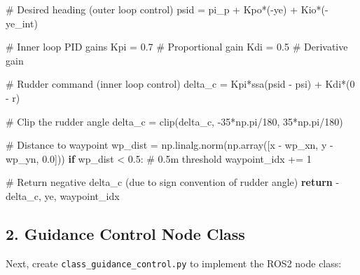 \documentclass[
  letterpaper,
  DIV=11,
  numbers=noendperiod]{scrreprt}
\newenvironment{Shaded}{\begin{snugshade}}{\end{snugshade}}
\newcommand{\CommentTok}[1]{\textcolor[rgb]{0.37,0.37,0.37}{#1}}
\newcommand{\ControlFlowTok}[1]{\textcolor[rgb]{0.00,0.23,0.31}{\textbf{#1}}}
\newcommand{\DecValTok}[1]{\textcolor[rgb]{0.68,0.00,0.00}{#1}}
\newcommand{\FloatTok}[1]{\textcolor[rgb]{0.68,0.00,0.00}{#1}}
\newcommand{\NormalTok}[1]{\textcolor[rgb]{0.00,0.23,0.31}{#1}}
\newcommand{\OperatorTok}[1]{\textcolor[rgb]{0.37,0.37,0.37}{#1}}
\begin{document}
\begin{Shaded}
\begin{Highlighting}[]
    \CommentTok{\# Desired heading (outer loop control)}
\NormalTok{    psid }\OperatorTok{=}\NormalTok{ pi\_p }\OperatorTok{+}\NormalTok{ Kpo}\OperatorTok{*}\NormalTok{(}\OperatorTok{{-}}\NormalTok{ye) }\OperatorTok{+}\NormalTok{ Kio}\OperatorTok{*}\NormalTok{(}\OperatorTok{{-}}\NormalTok{ye\_int)}
   
    \CommentTok{\# Inner loop PID gains}
\NormalTok{    Kpi }\OperatorTok{=} \FloatTok{0.7}  \CommentTok{\# Proportional gain}
\NormalTok{    Kdi }\OperatorTok{=} \FloatTok{0.5}  \CommentTok{\# Derivative gain}
    
    \CommentTok{\# Rudder command (inner loop control)}
\NormalTok{    delta\_c }\OperatorTok{=}\NormalTok{ Kpi}\OperatorTok{*}\NormalTok{ssa(psid }\OperatorTok{{-}}\NormalTok{ psi) }\OperatorTok{+}\NormalTok{ Kdi}\OperatorTok{*}\NormalTok{(}\DecValTok{0} \OperatorTok{{-}}\NormalTok{ r)}
    
    \CommentTok{\# Clip the rudder angle}
\NormalTok{    delta\_c }\OperatorTok{=}\NormalTok{ clip(delta\_c, }\OperatorTok{{-}}\DecValTok{35}\OperatorTok{*}\NormalTok{np.pi}\OperatorTok{/}\DecValTok{180}\NormalTok{, }\DecValTok{35}\OperatorTok{*}\NormalTok{np.pi}\OperatorTok{/}\DecValTok{180}\NormalTok{)}

    \CommentTok{\# Distance to waypoint}
\NormalTok{    wp\_dist }\OperatorTok{=}\NormalTok{ np.linalg.norm(np.array([x }\OperatorTok{{-}}\NormalTok{ wp\_xn, y }\OperatorTok{{-}}\NormalTok{ wp\_yn, }\FloatTok{0.0}\NormalTok{]))}
    \ControlFlowTok{if}\NormalTok{ wp\_dist }\OperatorTok{\textless{}} \FloatTok{0.5}\NormalTok{:  }\CommentTok{\# 0.5m threshold}
\NormalTok{        waypoint\_idx }\OperatorTok{+=} \DecValTok{1}

    \CommentTok{\# Return negative delta\_c (due to sign convention of rudder angle)}
    \ControlFlowTok{return} \OperatorTok{{-}}\NormalTok{delta\_c, ye, waypoint\_idx}
\end{Highlighting}
\end{Shaded}

\subsection*{2. Guidance Control Node
Class}\label{guidance-control-node-class}

Next, create \texttt{class\_guidance\_control.py} to implement the ROS2
node class:
\end{document}
